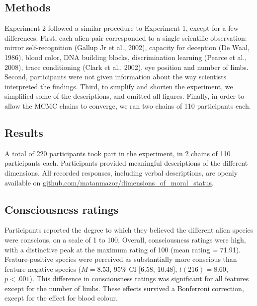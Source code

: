 \documentclass[10pt, letterpaper]{article}
\begin{document}
\hypertarget{methods-1}{%
\subsection{Methods}\label{methods-1}}

Experiment 2 followed a similar procedure to Experiment 1, except for a
few differences. First, each alien pair corresponded to a single
scientific observation: mirror self-recognition (Gallup Jr et al.,
2002), capacity for deception (De Waal, 1986), blood color, DNA building
blocks, discrimination learning (Pearce et al., 2008), trace
conditioning (Clark et al., 2002), eye position and number of limbs.
Second, participants were not given information about the way scientists
interpreted the findings. Third, to simplify and shorten the experiment,
we simplified some of the descriptions, and omitted all figures.
Finally, in order to allow the MCMC chains to converge, we ran two
chains of 110 participants each.

\hypertarget{results-1}{%
\subsection{Results}\label{results-1}}

A total of 220 participants took part in the experiment, in 2 chains of
110 participants each. Participants provided meaningful descriptions of
the different dimensions. All recorded responses, including verbal
descriptions, are openly available on
\href{https://github.com/matanmazor/dimensions_of_moral_status}{github.com/matanmazor/dimensions\_of\_moral\_status}.

\hypertarget{consciousness-ratings-1}{%
\subsection{Consciousness ratings}\label{consciousness-ratings-1}}

Participants reported the degree to which they believed the different
alien species were conscious, on a scale of 1 to 100. Overall,
consciousness ratings were high, with a distinctive peak at the maximum
rating of 100 (mean rating = 71.91). Feature-positive species were
perceived as substantially more conscious than feature-negative species
(\(M = 8.53\), 95\% CI \([6.58\), \(10.48]\), \(t(216) = 8.60\),
\(p < .001\)). This difference in consciousness ratings was significant
for all features except for the number of limbs. These effects survived
a Bonferroni correction, except for the effect for blood colour.
\end{document}
